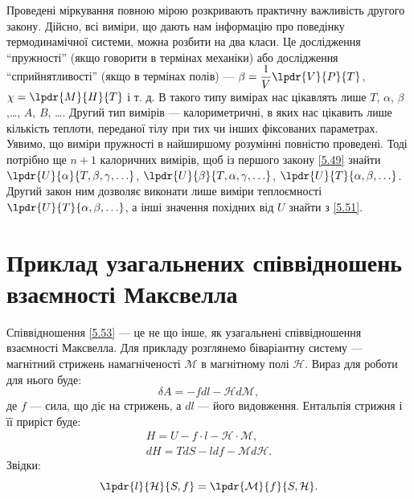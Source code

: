 Проведені міркування повною мірою розкривають практичну важливість другого закону. Дійсно, всі виміри, що дають нам інформацію про поведінку термодинамічної системи, можна розбити на два класи. Це дослідження \enquote{пружності} (якщо говорити в термінах механіки) або дослідження \enquote{сприйнятливості} (якщо в термінах полів) --- $\beta=\dfrac{1}{V}\lpdr{V}{P}{T}$, $\chi=\lpdr{M}{H}{T}$ і т. д. В такого типу вимірах нас цікавлять лише $T$, $\alpha$, $\beta$,\ldots, $A$, $B$, \ldots. Другий тип вимірів --- калориметричні, в яких нас цікавить лише кількість теплоти, переданої тілу при тих чи інших фіксованих параметрах. Уявимо, що виміри пружності в найширшому розумінні повністю проведені. Тоді потрібно ще $n+1$ калоричних вимірів, щоб із першого закону \eqref{5.49} знайти $\lpdr{U}{\alpha}{T,\beta,\gamma,\ldots}$, $\lpdr{U}{\beta}{T,\alpha, \gamma,\ldots}$, $\lpdr{U}{T}{\alpha,\beta,\ldots}$. Другий закон ним дозволяє виконати лише виміри теплоємності $\lpdr{U}{T}{\alpha,\beta,\ldots}$, а інші значення похідних від $U$ знайти з \eqref{5.51}.

\section{Приклад узагальнених співвідношень взаємності Максвелла}

Співвідношення \eqref{5.53} --- це не що інше, як узагальнені співвідношення взаємності Максвелла. Для прикладу розглянемо біваріантну систему --- магнітний стрижень намагніченості $\mathcal{M}$ в магнітному полі $\mathcal{H}$. Вираз для роботи для нього буде:
\begin{equation}\label{5.58}
	\delta A = -fdl-\mathcal{H}d\mathcal{M},
\end{equation}
де $f$ --- сила, що діє на стрижень, а $dl$ --- його видовження. Ентальпія стрижня і її приріст буде:
\begin{gather}
	H = U-f\cdot l - \mathcal{H}\cdot\mathcal{M}, \label{5.59} \\
    dH = TdS - ldf -\mathcal{M}d\mathcal{H}. \label{5.60}
\end{gather}
Звідки:
\begin{equation}\label{5.61}
	\lpdr{l}{\mathcal{H}}{S,f} = \lpdr{\mathcal{M}}{f}{S,\mathcal{H}}.
\end{equation}

